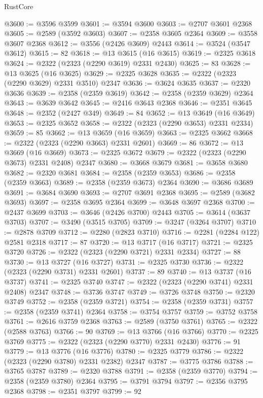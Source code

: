 \begin{lexlean}{RustCore}
\begin{coremodule}
@3600 := @3596 @3599
@3601 := @3594 @3600
@3603 := @2707 @3601 @2368
@3605 := @2589 (@3592 @3603)
@3607 := @2358 @3605 @2364
@3609 := @3558 @3607 @2368
@3612 := @3556 (@2426 @3609) @2443
@3614 := @3524 (@3547 @3612)
@3615 := 82
@3618 := @13 @3615 (@16 @3615)
@3619 := @2325 @3618
@3624 := @2322 (@2323 (@2290 @3619) @2331 @2430)
@3625 := 83
@3628 := @13 @3625 (@16 @3625)
@3629 := @2325 @3628
@3635 := @2322 (@2323 (@2290 @3629) @2331 @3510) @2347
@3636 := @3624 @3635
@3637 := @2320 @3636
@3639 := @2358 (@2359 @3619)
@3642 := @2358 (@2359 @3629) @2364
@3643 := @3639 @3642
@3645 := @2416 @3643 @2368
@3646 := @2351 @3645
@3648 := @2352 (@2427 @349)
@3649 := 84
@3652 := @13 @3649 (@16 @3649)
@3653 := @2325 @3652
@3658 := @2322 (@2323 (@2290 @3653) @2331 @2334)
@3659 := 85
@3662 := @13 @3659 (@16 @3659)
@3663 := @2325 @3662
@3668 := @2322 (@2323 (@2290 @3663) @2331 @2601)
@3669 := 86
@3672 := @13 @3669 (@16 @3669)
@3673 := @2325 @3672
@3679 := @2322 (@2323 (@2290 @3673) @2331 @2408) @2347
@3680 := @3668 @3679
@3681 := @3658 @3680
@3682 := @2320 @3681
@3684 := @2358 (@2359 @3653)
@3686 := @2358 (@2359 @3663)
@3689 := @2358 (@2359 @3673) @2364
@3690 := @3686 @3689
@3691 := @3684 @3690
@3693 := @2707 @3691 @2368
@3695 := @2589 (@3682 @3693)
@3697 := @2358 @3695 @2364
@3699 := @3648 @3697 @2368
@3700 := @2437 @3699
@3703 := @3646 (@2426 @3700) @2443
@3705 := @3614 (@3637 @3703)
@3707 := @3490 (@3515 @3705)
@3709 := @3247 (@3264 @3707)
@3710 := @2878 @3709
@3712 := @2280 (@2823 @3710)
@3716 := @2281 (@2284 @122) @2581 @2318
@3717 := 87
@3720 := @13 @3717 (@16 @3717)
@3721 := @2325 @3720
@3726 := @2322 (@2323 (@2290 @3721) @2331 @2334)
@3727 := 88
@3730 := @13 @3727 (@16 @3727)
@3731 := @2325 @3730
@3736 := @2322 (@2323 (@2290 @3731) @2331 @2601)
@3737 := 89
@3740 := @13 @3737 (@16 @3737)
@3741 := @2325 @3740
@3747 := @2322 (@2323 (@2290 @3741) @2331 @2408) @2347
@3748 := @3736 @3747
@3749 := @3726 @3748
@3750 := @2320 @3749
@3752 := @2358 (@2359 @3721)
@3754 := @2358 (@2359 @3731)
@3757 := @2358 (@2359 @3741) @2364
@3758 := @3754 @3757
@3759 := @3752 @3758
@3761 := @2616 @3759 @2368
@3763 := @2589 (@3750 @3761)
@3765 := @2322 (@2588 @3763)
@3766 := 90
@3769 := @13 @3766 (@16 @3766)
@3770 := @2325 @3769
@3775 := @2322 (@2323 (@2290 @3770) @2331 @2430)
@3776 := 91
@3779 := @13 @3776 (@16 @3776)
@3780 := @2325 @3779
@3786 := @2322 (@2323 (@2290 @3780) @2331 @2382) @2347
@3787 := @3775 @3786
@3788 := @3765 @3787
@3789 := @2320 @3788
@3791 := @2358 (@2359 @3770)
@3794 := @2358 (@2359 @3780) @2364
@3795 := @3791 @3794
@3797 := @2356 @3795 @2368
@3798 := @2351 @3797
@3799 := 92

\end{coremodule}
\end{lexlean}
